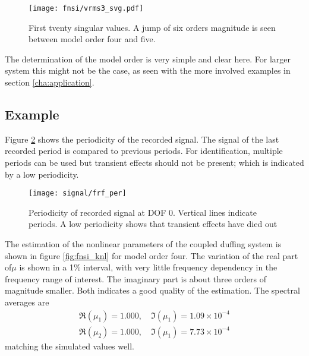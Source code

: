 \begin{figure}
  \centering
  \texttt{[image: fnsi/vrms3\_svg.pdf]}
  \caption{First tventy singular values. A jump of six orders magnitude is seen
    between model order four and five.}
  \label{fig:fnsi_svg}
\end{figure}

The determination of the model order is very simple and clear here. For larger system this
might not be the case, as seen with the more involved examples in section
\ref{cha:application}.

\subsection{Example}
\label{sec:fnsi_example}


Figure \ref{fig:periodicity} shows the periodicity of the recorded signal. The
signal of the last recorded period is compared to previous periods. For
identification, multiple periods can be used but transient effects should not be
present; which is indicated by a low periodicity.

\begin{figure}[!ht]
  \centering
  \texttt{[image: signal/frf\_per]}
  \caption{Periodicity of recorded signal at DOF 0. Vertical lines indicate
    periods. A low periodicity shows that transient effects have died out}
  \label{fig:periodicity}
\end{figure}


The estimation of the nonlinear parameters of the coupled duffing system is
shown in figure \ref{fig:fnsi_knl} for model order four. The variation of the
real part of$\mu$ is shown in a 1\% interval, with very little frequency
dependency in the frequency range of interest. The imaginary part is about three
orders of magnitude smaller. Both indicates a good quality of the estimation.
The spectral averages are
\begin{equation}
  \begin{aligned}
    \Re (\mu_1) = 1.000, \quad \Im (\mu_1) = 1.09 \times 10^{-4} \\
    \Re (\mu_2) = 1.000, \quad \Im (\mu_1) = 7.73 \times 10^{-4}
  \end{aligned}
\end{equation}
matching the simulated values well.

